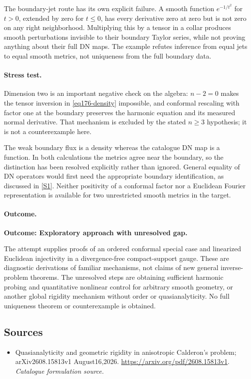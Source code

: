 \documentclass[11pt,a4paper]{article}
\newcommand{\sref}[2]{\hyperlink{source:#1:#2}{[S#2]}}
\numberwithin{equation}{section}
\begin{document}
The boundary-jet route has its own explicit failure. A smooth function
$e^{-1/t^2}$ for $t>0$, extended by zero for $t\le0$, has every derivative
zero at zero but is not zero on any right neighborhood. Multiplying this
by a tensor in a collar produces smooth perturbations invisible to their
boundary Taylor series, while not proving anything about their full DN
maps. The example refutes inference from equal jets to equal smooth metrics,
not uniqueness from the full boundary data.

\paragraph{Stress test.}
Dimension two is an important negative check on the algebra:
$n-2=0$ makes the tensor inversion in \eqref{eq176-density} impossible,
and conformal rescaling with factor one at the boundary preserves the
harmonic equation and its measured normal derivative. That mechanism is
excluded by the stated $n\ge3$ hypothesis; it is not a counterexample here.

The weak boundary flux is a density whereas the catalogue DN map is a
function. In both calculations the metrics agree near the boundary, so
the distinction has been resolved explicitly rather than ignored. General
equality of DN operators would first need the appropriate boundary
identification, as discussed in \sref{176}{1}. Neither positivity of a
conformal factor nor a Euclidean Fourier representation is available for
two unrestricted smooth metrics in the target.

\paragraph{Outcome.}
\textbf{Outcome: Exploratory approach with unresolved gap.}

The attempt supplies proofs of an ordered conformal special case and
linearized Euclidean injectivity in a divergence-free compact-support
gauge. These are diagnostic derivations of familiar mechanisms, not claims
of new general inverse-problem theorems. The unresolved steps are obtaining
sufficient harmonic probing and quantitative nonlinear control for arbitrary
smooth geometry, or another global rigidity mechanism without order or
quasianalyticity. No full uniqueness theorem or counterexample is obtained.
\subsection{Sources}
\begin{itemize}\raggedright
\item[\textnormal{[S1]}]\hypertarget{source:176:1}{} Quasianalyticity and geometric rigidity in anisotropic Calderon's problem; arXiv2608.15813v1 August16,2026.
\url{https://arxiv.org/pdf/2608.15813v1}.
{\small\textit{Catalogue formulation source.}}
\end{itemize}
\end{document}
